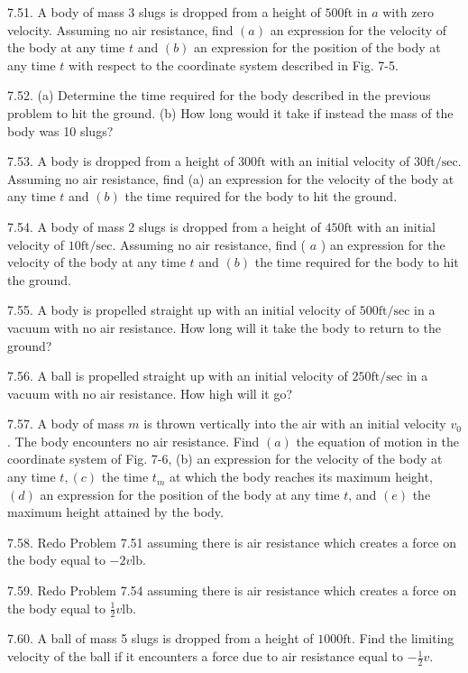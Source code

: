 \documentclass[10pt]{article}
\begin{document}
7.51. A body of mass 3 slugs is dropped from a height of $500 \mathrm{ft}$ in $a$ with zero velocity. Assuming no air resistance, find $(a)$ an expression for the velocity of the body at any time $t$ and $(b)$ an expression for the position of the body at any time $t$ with respect to the coordinate system described in Fig. 7-5.

7.52. (a) Determine the time required for the body described in the previous problem to hit the ground. (b) How long would it take if instead the mass of the body was 10 slugs?

7.53. A body is dropped from a height of $300 \mathrm{ft}$ with an initial velocity of $30 \mathrm{ft} / \mathrm{sec}$. Assuming no air resistance, find (a) an expression for the velocity of the body at any time $t$ and $(b)$ the time required for the body to hit the ground.

7.54. A body of mass 2 slugs is dropped from a height of $450 \mathrm{ft}$ with an initial velocity of $10 \mathrm{ft} / \mathrm{sec}$. Assuming no air resistance, find ( $a$ ) an expression for the velocity of the body at any time $t$ and $(b)$ the time required for the body to hit the ground.

7.55. A body is propelled straight up with an initial velocity of $500 \mathrm{ft} / \mathrm{sec}$ in a vacuum with no air resistance. How long will it take the body to return to the ground?

7.56. A ball is propelled straight up with an initial velocity of $250 \mathrm{ft} / \mathrm{sec}$ in a vacuum with no air resistance. How high will it go?

7.57. A body of mass $m$ is thrown vertically into the air with an initial velocity $v_{0}$. The body encounters no air resistance. Find $(a)$ the equation of motion in the coordinate system of Fig. 7-6, (b) an expression for the velocity of the body at any time $t,(c)$ the time $t_{m}$ at which the body reaches its maximum height, $(d)$ an expression for the position of the body at any time $t$, and $(e)$ the maximum height attained by the body.

7.58. Redo Problem 7.51 assuming there is air resistance which creates a force on the body equal to $-2 v \mathrm{lb}$.

7.59. Redo Problem 7.54 assuming there is air resistance which creates a force on the body equal to $\frac{1}{2} v \mathrm{lb}$.

7.60. A ball of mass 5 slugs is dropped from a height of $1000 \mathrm{ft}$. Find the limiting velocity of the ball if it encounters a force due to air resistance equal to $-\frac{1}{2} v$.
\end{document}
